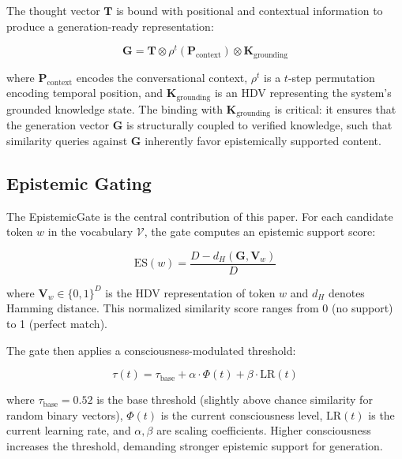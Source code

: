 \documentclass[12pt,a4paper]{article}
\begin{document}
The thought vector $\mathbf{T}$ is bound with positional and contextual information to produce a generation-ready representation:

\begin{equation}
\mathbf{G} = \mathbf{T} \otimes \rho^t(\mathbf{P}_{\text{context}}) \otimes \mathbf{K}_{\text{grounding}}
\end{equation}

where $\mathbf{P}_{\text{context}}$ encodes the conversational context, $\rho^t$ is a $t$-step permutation encoding temporal position, and $\mathbf{K}_{\text{grounding}}$ is an HDV representing the system's grounded knowledge state. The binding with $\mathbf{K}_{\text{grounding}}$ is critical: it ensures that the generation vector $\mathbf{G}$ is structurally coupled to verified knowledge, such that similarity queries against $\mathbf{G}$ inherently favor epistemically supported content.

\subsection{Epistemic Gating}

The EpistemicGate is the central contribution of this paper. For each candidate token $w$ in the vocabulary $\mathcal{V}$, the gate computes an epistemic support score:

\begin{equation}
\text{ES}(w) = \frac{D - d_H(\mathbf{G}, \mathbf{V}_w)}{D}
\label{eq:epistemic-support}
\end{equation}

where $\mathbf{V}_w \in \{0,1\}^D$ is the HDV representation of token $w$ and $d_H$ denotes Hamming distance. This normalized similarity score ranges from 0 (no support) to 1 (perfect match).

The gate then applies a consciousness-modulated threshold:

\begin{equation}
\tau(t) = \tau_{\text{base}} + \alpha \cdot \Phi(t) + \beta \cdot \text{LR}(t)
\label{eq:threshold}
\end{equation}

where $\tau_{\text{base}} = 0.52$ is the base threshold (slightly above chance similarity for random binary vectors), $\Phi(t)$ is the current consciousness level, $\text{LR}(t)$ is the current learning rate, and $\alpha, \beta$ are scaling coefficients. Higher consciousness increases the threshold, demanding stronger epistemic support for generation.
\end{document}
